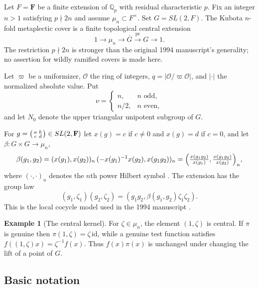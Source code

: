 \documentclass[12pt,letterpaper]{article}
\theoremstyle{definition}
\newtheorem{example}[theorem]{Example}
\theoremstyle{remark}
\newcommand{\F}{\mathbf{F}}
\newcommand{\bG}{\overline{G}}
\newcommand{\pr}{\mathrm{pr}}
\begin{document}
Let $F=\F$ be a finite extension of $\mathbb Q_p$ with residual
characteristic $p$.  Fix an integer $n>1$ satisfying $p\nmid 2n$
and assume $\mu_n\subset F^\times$.  Set $G=SL(2,F)$.  The Kubota
$n$-fold metaplectic cover is a finite topological central extension
\[
1\longrightarrow\mu_n\longrightarrow\bG\xrightarrow{\ \pr\ }G
\longrightarrow1.
\]
The restriction $p\nmid 2n$ is stronger than the original 1994
manuscript's generality; no assertion for wildly ramified covers is
made here.


Let $\varpi$ be a uniformizer, $\mathcal O$ the ring of integers, $q=|\mathcal O/\varpi\mathcal O|$,
and $|\cdot|$ the normalized absolute value. Put
\begin{equation}\label{eqn:N}
\nu=\begin{cases}n,& n\text{ odd},\\ n/2,& n\text{ even},\end{cases}
\end{equation}
and let $N_0$ denote
the upper triangular unipotent subgroup of $G$.

For $g=\begin{psmallmatrix}a&b\\c&d\end{psmallmatrix}\in SL(2,\F)$ let $x(g)=c$ if $c\ne0$ and
$x(g)=d$ if $c=0$, and let $\beta:G\times G\to\mu_n$,
\[
\beta(g_1,g_2)=(x(g_1),x(g_2))_n\,(-x(g_1)^{-1}x(g_2),x(g_1g_2))_n
=\Bigl(\tfrac{x(g_1g_2)}{x(g_1)},\tfrac{x(g_1g_2)}{x(g_2)}\Bigr)_n,
\]
where $(\cdot,\cdot)_n$ denotes the $n$th power Hilbert symbol
\cite{We75}.  The extension has the group law
\begin{equation}\label{eq:group-law}
 (g_1,\zeta_1)(g_2,\zeta_2)=(g_1g_2,\beta(g_1,g_2)\zeta_1\zeta_2).
\end{equation}
This is the local cocycle model used in the 1994 manuscript
\cite{Jo94}.
\begin{example}[The central kernel]\label{ex:central}
For $\zeta\in\mu_n$, the element $(1,\zeta)$ is central.  If $\pi$
is genuine then $\pi(1,\zeta)=\zeta\,\mathrm{id}$, while a genuine
test function satisfies $f((1,\zeta)x)=\zeta^{-1}f(x)$.
Thus $f(x)\pi(x)$ is unchanged under changing the lift of a point
of $G$.
\end{example}

\subsection{Basic notation}\label{subsec:notation}
\end{document}
